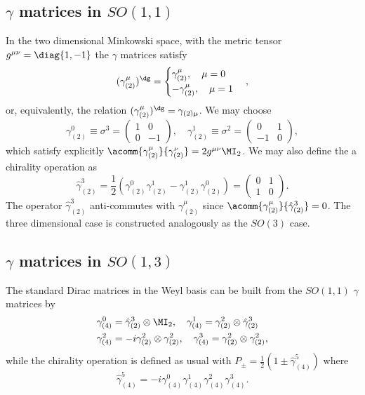 \subsection{\texorpdfstring{$\gamma$}{gamma} matrices in \texorpdfstring{$SO(1,1)$}{SO(1,1)}}
In the two dimensional Minkowski space, with the metric tensor $g^{\mu\nu} =\diag{1,-1}$ the $\gamma$ matrices satisfy
\begin{equation}
    (\gamma^\mu_{(2)})^\dg = 
    \begin{cases}
        \gamma^\mu_{(2)},\quad \mu = 0 \\
        -\gamma^\mu_{(2)},\quad \mu = 1
    \end{cases},
\end{equation}
or, equivalently, the relation $(\gamma^\mu_{(2)})^\dg = \gamma_{(2)\mu}$. We may choose
\begin{equation}
    \gamma^0_{(2)} \equiv \sigma^3 = 
    \begin{pmatrix}
        1 & 0 \\
        0 & -1
    \end{pmatrix},\quad \gamma^1_{(2)} \equiv \sigma^2 =
    \begin{pmatrix}
        0 & 1 \\
        -1 & 0
    \end{pmatrix},
\end{equation}
which satisfy explicitly $\acomm{\gamma^\mu_{(2)}}{\gamma^\nu_{(2)}} = 2g^{\mu\nu}\MI_2$. We may also define the a chirality operation as
\begin{equation}
    \hat{\gamma}^3_{(2)} = \frac{1}{2}(\gamma^0_{(2)}\gamma^1_{(2)} - \gamma^1_{(2)}\gamma^0_{(2)}) = 
    \begin{pmatrix}
        0 & 1 \\
        1 & 0
    \end{pmatrix}.
\end{equation}
The operator $\hat{\gamma}^3_{(2)}$ anti-commutes with $\gamma^\mu_{(2)}$ since $\acomm{\gamma^\mu_{(2)}}{\hat{\gamma}^3_{(2)}} = 0$. The three dimensional case is constructed analogously as the $SO(3)$ case.

\subsection{\texorpdfstring{$\gamma$}{gamma} matrices in \texorpdfstring{$SO(1,3)$}{SO(1,3)}} 
The standard Dirac matrices in the Weyl basis can be built from the $SO(1,1)$ $\gamma$ matrices by
\begin{align}
    \gamma^0_{(4)} &= \hat{\gamma}^3_{(2)} \otimes \MI_2,\quad \gamma^1_{(4)} = \gamma^2_{(2)} \otimes \hat{\gamma}^3_{(2)} \\
    \gamma^2_{(4)} &= -i\gamma^2_{(2)} \otimes \gamma^2_{(2)},\quad \gamma^3_{(4)} = \gamma^2_{(2)} \otimes \gamma^2_{(2)},
\end{align}
while the chirality operation is defined as usual with $P_\pm = \frac{1}{2}(1 \pm \hat{\gamma}^5_{(4)})$ where
\begin{equation}
    \hat{\gamma}^5_{(4)} = -i\gamma^0_{(4)}\gamma^1_{(4)}\gamma^2_{(4)}\gamma^3_{(4)}.
\end{equation}

